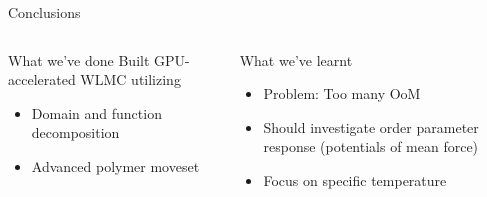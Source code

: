 \documentclass[aspectratio=169]{beamer}
\begin{document}
\begin{frame}[c]{Conclusions}

  \begin{columns}[T, onlytextwidth]


    \centering
    \begin{block}{What we've done}
      Built GPU-accelerated WLMC utilizing
      \begin{itemize} 
      \item Domain and function decomposition
      \item Advanced polymer moveset
    \end{itemize}
    \end{block}

    \begin{block}{What we've learnt}
      \begin{itemize} 
        \item Problem: Too many OoM
        \item Should investigate order parameter response (potentials of mean force)
        \item Focus on specific temperature 
      \end{itemize}
    \end{block}

    \vspace{4pt}
\end{columns}
\end{frame}
\end{document}
